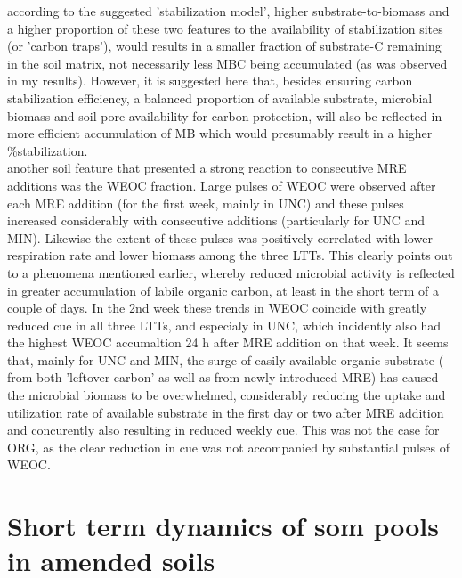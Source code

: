 	 according to the suggested 'stabilization model', higher substrate-to-biomass and a higher proportion of these two features to the availability of stabilization sites (or 'carbon traps'), would results in a smaller fraction of substrate-C remaining in the soil matrix, not necessarily less MBC being accumulated (as was observed in my results). However, it is suggested here that, besides ensuring carbon stabilization efficiency, a balanced proportion of available substrate, microbial biomass and soil pore availability for carbon protection, will also be reflected in more efficient accumulation of MB which would presumably result in a higher \%stabilization.\\
 	 another soil feature that presented a strong reaction to consecutive MRE additions was the WEOC fraction. Large pulses of WEOC were observed after each MRE addition (for the first week, mainly in UNC) and these pulses increased considerably with consecutive additions (particularly for UNC and MIN). Likewise the extent of these pulses was positively correlated with lower respiration rate and lower biomass among the three LTTs. This clearly points out to a phenomena mentioned earlier, whereby reduced microbial activity is reflected in greater accumulation of labile organic carbon, at least in the short term of a couple of days. In the 2nd week these trends in WEOC coincide with greatly reduced \gls{cue} in all three LTTs, and especialy in UNC, which incidently also had the highest WEOC accumaltion 24 h after MRE addition on that week. It seems that, mainly for UNC and MIN, the surge of easily available organic substrate ( from both 'leftover carbon' as well as from newly introduced MRE) has caused the microbial biomass to be overwhelmed, considerably reducing the uptake and utilization rate of available substrate in the first day or two after MRE addition and concurently also resulting in reduced weekly \gls{cue}.
	 This was not the case for ORG, as the clear reduction in \gls{cue} was not accompanied by substantial pulses of WEOC.

\section{Short term dynamics of \gls{som} pools in amended soils}

